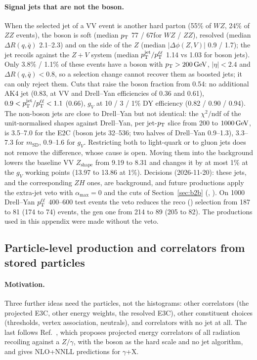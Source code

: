 \paragraph{Signal jets that are not the boson.} When the selected jet of a VV event is another hard parton (55\% of $WZ$,
24\% of $ZZ$ events), the boson is soft (median $p_{\mathrm{T}}$ 77 / 67\GeV for $WZ$ / $ZZ$), resolved (median $\Delta R(q,\bar q)$
2.1--2.3) and on the side of the $Z$ (median $|\Delta\phi(Z,V)|$ 0.9 / 1.7); the jet recoils against the $Z+V$ system
(median $p_{\mathrm{T}}^{\mathrm{jet}}/p_{\mathrm{T}}^{\ell\ell}$ 1.14 vs 1.03 for boson jets). Only 3.8\% / 1.1\% of these events have a boson with
$p_{\mathrm{T}} > 200\,\mathrm{GeV}$, $|\eta| < 2.4$ and $\Delta R(q,\bar q) < 0.8$, so a selection change cannot recover them as boosted
jets; it can only reject them. Cuts that raise the boson fraction from 0.54: no additional AK4 jet (0.83, at VV and
Drell--Yan efficiencies of 0.36 and 0.61), $0.9 < p_{\mathrm{T}}^{\mathrm{jet}}/p_{\mathrm{T}}^{\ell\ell} < 1.1$ (0.66), $g_V$ at 10 / 3 / 1\% DY efficiency
(0.82 / 0.90 / 0.94). The non-boson jets are close to Drell--Yan but not identical: the $\chi^2/\mathrm{ndf}$ of the
unit-normalised shapes against Drell--Yan, per jet-$p_{\mathrm{T}}$ slice from 200 to $1000\,\mathrm{GeV}$, is 3.5--7.0 for the E2C (boson
jets 32--536; two halves of Drell--Yan 0.9--1.3), 3.3--7.3 for $m_\mathrm{SD}$, 0.9--1.6 for $g_V$. Restricting both to
light-quark or to gluon jets does not remove the difference, whose cause is open. Moving them into the background lowers
the baseline VV $Z_\mathrm{shape}$ from 9.19 to 8.31 and changes it by at most 1\% at the $g_V$ working points
(13.97 to 13.86 at 1\%). Decisions (2026-11-20): these jets, and the corresponding $ZH$ ones, are background, and future
productions apply the extra-jet veto with $\alpha_\mathrm{max} = 0$ and the cuts of Section~\ref{sec:b2b}
(, ). On 1000 Drell--Yan $p_{\mathrm{T}}^{\ell\ell}$ 400--600 test events the veto reduces the reco
 () selection from 187 to 81 (174 to 74) events, the gen one from 214 to 89 (205 to 82). The
productions used in this appendix were made without the veto.

\subsection{Particle-level production and correlators from stored particles}
\label{app:sens:particles}

\paragraph{Motivation.} Three further ideas need the particles, not the histograms: other correlators (the projected E3C,
other energy weights, the resolved E3C), other constituent choices (thresholds, vertex association, neutrals), and
correlators with no jet at all. The last follows Ref.~\cite{Generet:2026vto}, which proposes projected energy
correlators of all radiation recoiling against a $Z/\gamma$, with the boson as the hard scale and no jet algorithm,
and gives NLO+NNLL predictions for $\gamma$+X.

